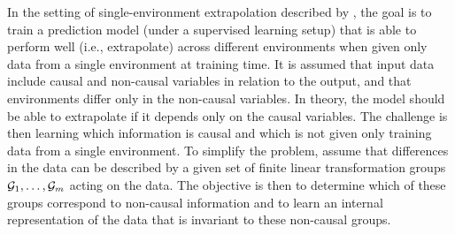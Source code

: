 In the setting of single-environment extrapolation described by \textcite{Mouli:2021}, the goal is to train a prediction model (under a supervised learning setup) that is able to perform well (i.e., extrapolate) across different environments when given only data from a single environment at training time. It is assumed that input data include causal and non-causal variables in relation to the output, and that environments differ only in the non-causal variables. In theory, the model should be able to extrapolate if it depends only on the causal variables. The challenge is then learning which information is causal and which is not given only training data from a single environment. To simplify the problem, \citeauthor{Mouli:2021} assume that differences in the data can be described by a given set of finite linear transformation groups $\mathcal{G}_1,\ldots,\mathcal{G}_m$ acting on the data. The objective is then to determine which of these groups correspond to non-causal information and to learn an internal representation of the data that is invariant to these non-causal groups.
\\

